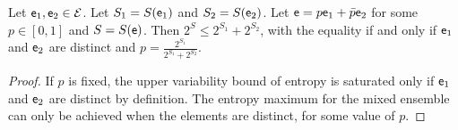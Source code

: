 \begin{prop}\label{pm_es_exponentialEntropySubadditivity}
	Let $\mathsf{e}_1, \mathsf{e}_2 \in \mathcal{E}$. Let $S_1 = S(\mathsf{e}_1)$ and $S_2 = S(\mathsf{e}_2)$. Let $\mathsf{e} = p \mathsf{e}_1 + \bar{p} \mathsf{e}_2$ for some $p \in [0,1]$ and $S = S(\mathsf{e})$. Then $2^S \leq 2^{S_1} + 2^{S_2}$, with the equality if and only if $\mathsf{e}_1$ and $\mathsf{e}_2$ are distinct and $p = \frac{2^{S_1}}{2^{S_1} + 2^{S_2}}$.
\end{prop}

\begin{proof}
	If $p$ is fixed, the upper variability bound of entropy is saturated only if $\mathsf{e}_1$ and $\mathsf{e}_2$ are distinct by definition. The entropy maximum for the mixed ensemble can only be achieved when the elements are distinct, for some value of $p$.
	

\end{proof}
